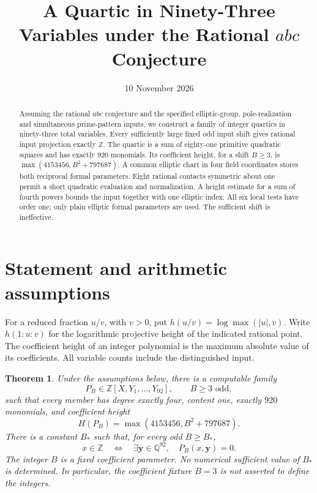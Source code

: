 \documentclass[11pt,a4paper]{article}
\title{A Quartic in Ninety-Three Variables under the Rational $abc$ Conjecture}
\author{}\date{10 November 2026}
\newtheorem{theorem}{Theorem}[section]
\newcommand{\Q}{\mathbb Q}\newcommand{\Z}{\mathbb Z}
\begin{document}
\maketitle
\begin{abstract}
Assuming the rational $abc$ conjecture and the specified elliptic-group,
pole-realization and simultaneous prime-pattern inputs, we construct a
family of integer quartics in ninety-three total variables. Every
sufficiently large fixed odd input shift gives rational input projection
exactly $\Z$. The quartic is a sum of eighty-one primitive quadratic
squares and has exactly $920$ monomials. Its coefficient height, for a
shift $B\ge3$, is $\max(4153456,B^2+797687)$. A common elliptic chart in four field coordinates stores both reciprocal
formal parameters. Eight rational contacts symmetric about one permit a short quadratic evaluation and normalization.
A height estimate for a sum of fourth powers bounds the input together
with one elliptic index. All six local tests have order one; only plain
elliptic formal parameters are used. The sufficient shift is ineffective.
\end{abstract}

\section{Statement and arithmetic assumptions}

For a reduced fraction $u/v$, with $v>0$, put
$h(u/v)=\log\max(|u|,v)$. Write $h(1:u:v)$ for the logarithmic
projective height of the indicated rational point. The coefficient height
of an integer polynomial is the maximum absolute value of its coefficients.
All variable counts include the distinguished input.

\begin{theorem}\label{thm:main}
Under the assumptions below, there is a computable family
\[
 P_B\in\Z[X,Y_1,\ldots,Y_{92}],\qquad B\ge3\text{ odd},
\]
such that every member has degree exactly four, content one, exactly
$920$ monomials, and coefficient height
\[
 H(P_B)=\max(4153456,B^2+797687).
\]
There is a constant $B_*$ such that, for every odd $B\ge B_*$,
\[
 x\in\Z\quad\Longleftrightarrow\quad
 \exists\boldsymbol y\in\Q^{92},\quad P_B(x,\boldsymbol y)=0.
\]
The integer $B$ is a fixed coefficient parameter. No numerical sufficient
value of $B_*$ is determined. In particular, the coefficient fixture
$B=3$ is not asserted to define the integers.
\end{theorem}
\end{document}
